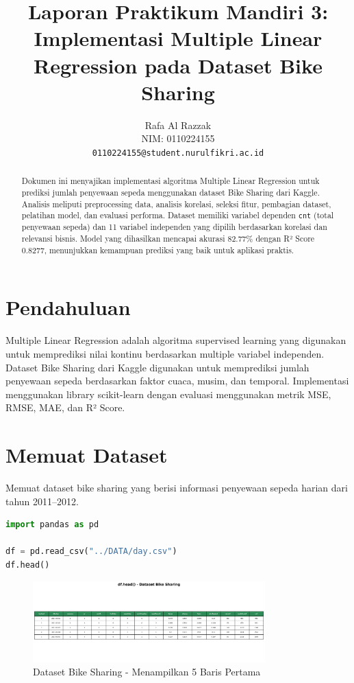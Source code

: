 \documentclass[11pt,a4paper]{article}
\title{\textbf{Laporan Praktikum Mandiri 3: Implementasi Multiple Linear Regression pada Dataset Bike Sharing}}
\author{Rafa Al Razzak \\ NIM: 0110224155 \\ \texttt{0110224155@student.nurulfikri.ac.id}}
\begin{document}
\maketitle
\onehalfspacing

\begin{abstract}
Dokumen ini menyajikan implementasi algoritma Multiple Linear Regression untuk prediksi jumlah penyewaan sepeda menggunakan dataset Bike Sharing dari Kaggle.
Analisis meliputi preprocessing data, analisis korelasi, seleksi fitur, pembagian dataset, pelatihan model, dan evaluasi performa.
Dataset memiliki variabel dependen \texttt{cnt} (total penyewaan sepeda) dan 11 variabel independen yang dipilih berdasarkan korelasi dan relevansi bisnis.
Model yang dihasilkan mencapai akurasi 82.77\% dengan R² Score 0.8277, menunjukkan kemampuan prediksi yang baik untuk aplikasi praktis.
\end{abstract}

\vspace{-1mm}

\section{Pendahuluan}
Multiple Linear Regression adalah algoritma supervised learning yang digunakan untuk memprediksi nilai kontinu berdasarkan multiple variabel independen.
Dataset Bike Sharing dari Kaggle digunakan untuk memprediksi jumlah penyewaan sepeda berdasarkan faktor cuaca, musim, dan temporal.
Implementasi menggunakan library scikit-learn dengan evaluasi menggunakan metrik MSE, RMSE, MAE, dan R² Score.

\section{Memuat Dataset}
Memuat dataset bike sharing yang berisi informasi penyewaan sepeda harian dari tahun 2011--2012.
\begin{lstlisting}[language=Python]
import pandas as pd

df = pd.read_csv("../DATA/day.csv")
df.head()
\end{lstlisting}

\begin{figure}[h]
    \centering
    \includegraphics[width=0.8\textwidth]{./OUTPUT/step1_dataset_head.png}
    \caption{Dataset Bike Sharing - Menampilkan 5 Baris Pertama}
    \label{fig:dataset_head}
\end{figure}
\end{document}
